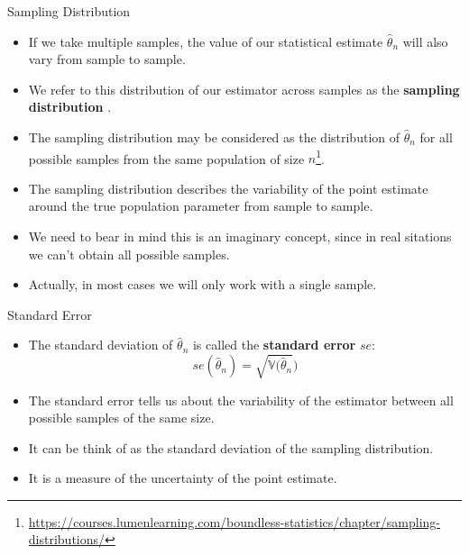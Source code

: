 \documentclass[handout]{beamer}
\begin{document}
\begin{frame}{Sampling Distribution}

\scriptsize{

\begin{itemize}
\item If we take multiple samples, the value of our statistical estimate $\hat{\theta}_n$ will also vary from sample to sample.

\item We refer to this distribution of our estimator across samples as the   \textbf{sampling distribution} \cite{poldrack2019statistical}.

\item The sampling distribution may be considered as the distribution of  $\hat{\theta}_n$ for all possible samples from the same population of size $n$\footnote{\url{https://courses.lumenlearning.com/boundless-statistics/chapter/sampling-distributions/}}.

\item The sampling distribution describes the variability of the point estimate around the true population parameter from sample to sample. 

\item We need to bear in mind this is an imaginary concept, since in real sitations we can't obtain all possible samples.

\item Actually, in most cases we will only work with a single sample.

\end{itemize}

} 
\end{frame}


\begin{frame}{Standard Error}

\scriptsize{

\begin{itemize}
\item The standard deviation of $\hat{\theta}_n$ is called the \textbf{standard error} $se$:
\begin{displaymath}
se(\hat{\theta}_n)=\sqrt{\mathbb{V}(\hat{\theta}_n})
\end{displaymath}
\item The standard error tells us about the variability of the estimator between all possible samples of the same size.
\item It can be think of as the standard deviation of the sampling distribution. 
\item It is a measure of the uncertainty of the point estimate.
\end{itemize}

} 
\end{frame}
\end{document}
